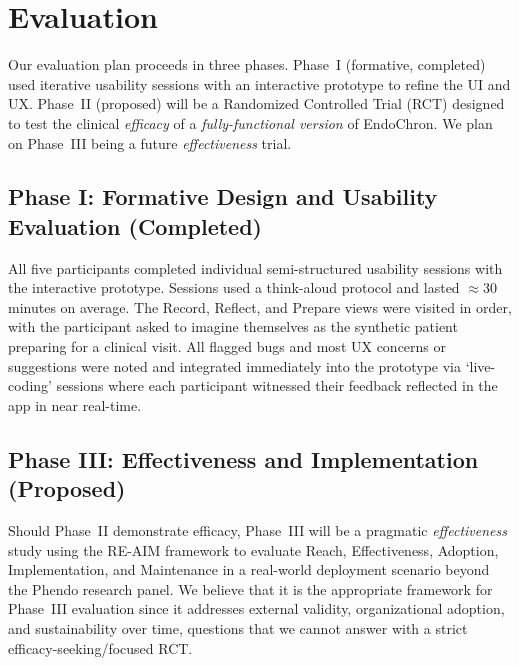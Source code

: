 \section{Evaluation}

Our evaluation plan proceeds in three phases. Phase~I (formative, completed) used iterative usability sessions with an interactive prototype to refine the UI and UX. Phase~II (proposed) will be a Randomized Controlled Trial (RCT) designed to test the clinical \textit{efficacy} of a \textit{fully-functional version} of EndoChron. We plan on Phase~III being a future \textit{effectiveness} trial.

\subsection{Phase I: Formative Design and Usability Evaluation (Completed)}

All five participants completed individual semi-structured usability sessions with the interactive prototype. Sessions used a think-aloud protocol\cite{Ericsson1980Verbal} and lasted $\approx$30 minutes on average. The Record, Reflect, and Prepare views were visited in order, with the participant asked to imagine themselves as the synthetic patient preparing for a clinical visit. All flagged bugs and most UX concerns or suggestions were noted and integrated immediately into the prototype via `live-coding' sessions where each participant witnessed their feedback reflected in the app in near real-time.



\subsection{Phase III: Effectiveness and Implementation (Proposed)}

Should Phase~II demonstrate efficacy, Phase~III will be a pragmatic \textit{effectiveness} study using the RE-AIM framework\cite{Glasgow1999REAIM} to evaluate Reach, Effectiveness, Adoption, Implementation, and Maintenance in a real-world deployment scenario beyond the Phendo research panel. We believe that it is the appropriate framework for Phase~III evaluation since it addresses external validity, organizational adoption, and sustainability over time, questions that we cannot answer with a strict efficacy-seeking/focused RCT.
